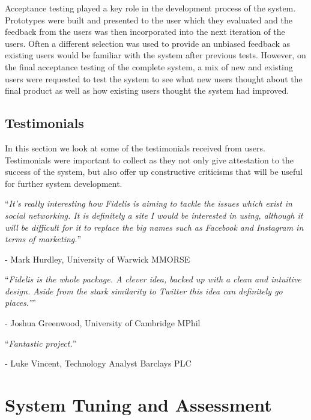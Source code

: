Acceptance testing played a key role in the development process of the system. Prototypes were built and presented to the user which they evaluated and the feedback from the users was then incorporated into the next iteration of the users. Often a different selection was used to provide an unbiased feedback as existing users would be familiar with the system after previous tests. However, on the final acceptance testing of the complete system, a mix of new and existing users were requested to test the system to see what new users thought about the final product as well as how existing users thought the system had improved.

\subsection{Testimonials}
In this section we look at some of the testimonials received from users. Testimonials were important to collect as they not only give attestation to the success of the system, but also offer up constructive criticisms that will be useful for further system development.

\begin{displayquote}
	\enquote{\textit{It's really interesting how Fidelis is aiming to tackle the issues which exist in social networking. It is definitely a site I would be interested in using, although it will be difficult for it to replace the big names such as Facebook and Instagram in terms of marketing.}}
	
	- Mark Hurdley, University of Warwick MMORSE
\end{displayquote}

\begin{displayquote}
	\enquote{\textit{Fidelis is the whole package. A clever idea, backed up with a clean and intuitive design. Aside from the stark similarity to Twitter this idea can definitely go places.''}}
	
	- Joshua Greenwood, University of Cambridge MPhil
\end{displayquote}

\begin{displayquote}
	\enquote{\textit{Fantastic project.}}
	
	- Luke Vincent, Technology Analyst Barclays PLC
\end{displayquote}

\section{System Tuning and Assessment}